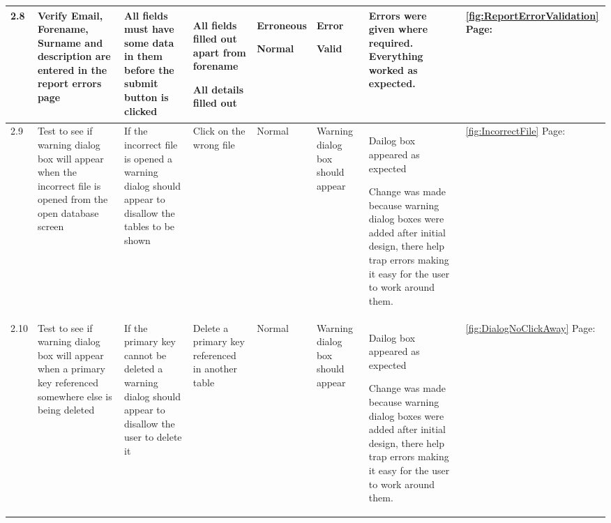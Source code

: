 \begin{landscape}
\begin{center}
\begin{longtable}{|p{1.5cm}|p{2cm}|p{2.5cm}|p{2cm}|p{2cm}|p{2cm}|p{3cm}|p{1.7cm}|}
2.8 & Verify Email, Forename, Surname and description are entered in the report errors page & All fields must have some data in them before the submit  button is clicked & All fields filled out apart from forename \par \bigskip All details filled out & Erroneous \par \bigskip \bigskip Normal & Error \par \bigskip \bigskip Valid &Errors were given where required. Everything worked as expected.&\ref {fig:ReportErrorValidation} Page: \pageref{fig:ReportErrorValidation}  \\ \hline
\rowcolor{lightgray}2.9 & Test to see if warning dialog box will appear when the incorrect file is opened from the open database screen & If the incorrect file is opened a warning dialog should appear to disallow the tables to be shown & Click on the wrong file & Normal &Warning dialog box should appear &Dailog box appeared as expected  \par Change was made because warning dialog boxes were added after initial design, there help trap errors making it easy for the user to work around them. & \ref {fig:IncorrectFile} Page: \pageref{fig:IncorrectFile} \\ \hline
\rowcolor{lightgray}2.10& Test to see if warning dialog box will appear when a primary key referenced somewhere else is being deleted & If the primary key cannot be deleted a warning dialog should appear to disallow the user to delete it & Delete a primary key referenced in another table & Normal &Warning dialog box should appear &Dailog box appeared as expected \par Change was made because warning dialog boxes were added after initial design, there help trap errors making it easy for the user to work around them.& \ref{fig:DialogNoClickAway} Page: \pageref{fig:DialogNoClickAway} \\ \hline



\end{longtable}
\end{center}
\end{landscape}
